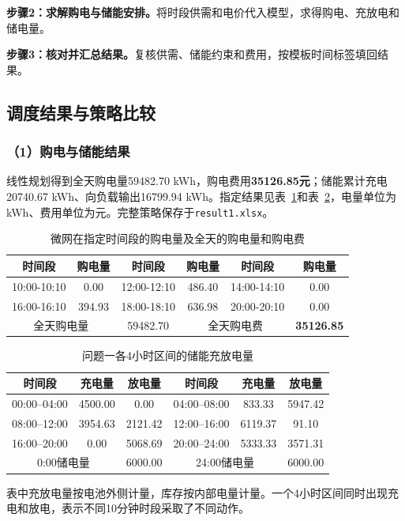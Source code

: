 \noindent\textbf{步骤2：求解购电与储能安排。}将时段供需和电价代入模型，求得购电、充放电和储电量。

\noindent\textbf{步骤3：核对并汇总结果。}复核供需、储能约束和费用，按模板时间标签填回结果。

\subsection{调度结果与策略比较}
\subsubsection*{（1）购电与储能结果}
线性规划得到全天购电量59482.70 kWh，购电费用\textbf{35126.85元}；储能累计充电20740.67 kWh、向负载输出16799.94 kWh。指定结果见表~\ref{tab:q1_purchase_result}和表~\ref{tab:q1_storage_result}，电量单位为kWh、费用单位为元。完整策略保存于\texttt{result1.xlsx}。
\begin{table}[!htbp]
    \centering
    \caption{微网在指定时间段的购电量及全天的购电量和购电费 }
    \label{tab:q1_purchase_result}
    \begin{tabular}{|c|c|c|c|c|c|}
        \hline
        时间段 & 购电量 & 时间段 & 购电量 & 时间段 & 购电量 \\
        \hline
        10:00-10:10 & 0.00 & 12:00-12:10 & 486.40 & 14:00-14:10 & 0.00 \\
        \hline
        16:00-16:10 & 394.93 & 18:00-18:10 & 636.98 & 20:00-20:10 & 0.00 \\
        \hline
        \multicolumn{2}{|c|}{全天购电量} & \multicolumn{1}{c|}{59482.70} & \multicolumn{2}{c|}{全天购电费} & \multicolumn{1}{c|}{\textbf{35126.85}}\\
        \hline
    \end{tabular}
\end{table}
\begin{table}[!htbp]
    \centering
    \caption{问题一各4小时区间的储能充放电量}
    \label{tab:q1_storage_result}
    \begin{tabular}{|c|c|c|c|c|c|}
        \hline
        时间段 & 充电量 & 放电量 & 时间段 & 充电量 & 放电量 \\
        \hline
        00:00--04:00 & 4500.00 & 0.00 & 04:00--08:00 & 833.33 & 5947.42 \\
        \hline
        08:00--12:00 & 3954.63 & 2121.42 & 12:00--16:00 & 6119.37 & 91.10 \\
        \hline
        16:00--20:00 & 0.00 & 5068.69 & 20:00--24:00 & 5333.33 & 3571.31 \\
        \hline
        \multicolumn{2}{|c|}{0:00储电量} & \multicolumn{1}{|c|}{6000.00} & \multicolumn{2}{c|}{24:00储电量} & \multicolumn{1}{c|}{6000.00}\\
        \hline
    \end{tabular}
\end{table}
表中充放电量按电池外侧计量，库存按内部电量计量。一个4小时区间同时出现充电和放电，表示不同10分钟时段采取了不同动作。

